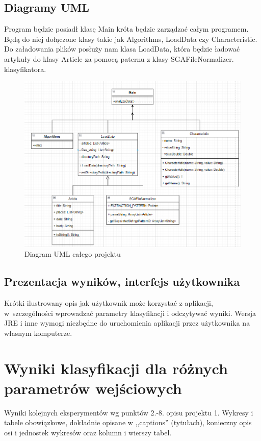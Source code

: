 \documentclass{classrep}
\begin{document}
\subsection{Diagramy UML}
Program będzie posiadł klasę Main króta będzie zarządzać całym programem. Będą do niej dołączone klasy takie jak Algorithms, LoadData czy Characteristic. Do załadowania plików posłuży nam klasa LoadData, która będzie ładować artykuły do klasy Article za pomocą paternu z klasy SGAFileNormalizer.
klasyfikatora.\\
\begin{figure}[!htbp]
	\centering
     \includegraphics[width=\textwidth]{img/uml.png}
	\caption{Diagram UML całego projektu}
\end{figure}



\subsection{Prezentacja wyników, interfejs użytkownika} 
Krótki ilustrowany opis jak użytkownik może korzystać z aplikacji, w~szczególności wprowadzać parametry klasyfikacji i odczytywać wyniki. Wersja JRE i inne wymogi
niezbędne do uruchomienia aplikacji przez użytkownika na własnym komputerze. \\

\section{Wyniki klasyfikacji dla różnych parametrów wejściowych}
Wyniki kolejnych eksperymentów wg punktów 2.-8. opisu projektu 1.  Wykresy i tabele
obowiązkowe, dokładnie opisane w ,,captions'' (tytułach), konieczny opis osi i
jednostek wykresów oraz kolumn i wierszy tabel.\\ 
\end{document}
